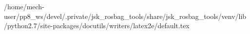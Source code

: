 /home/mech-user/pp8_ws/devel/.private/jsk_rosbag_tools/share/jsk_rosbag_tools/venv/lib/python2.7/site-packages/docutils/writers/latex2e/default.tex